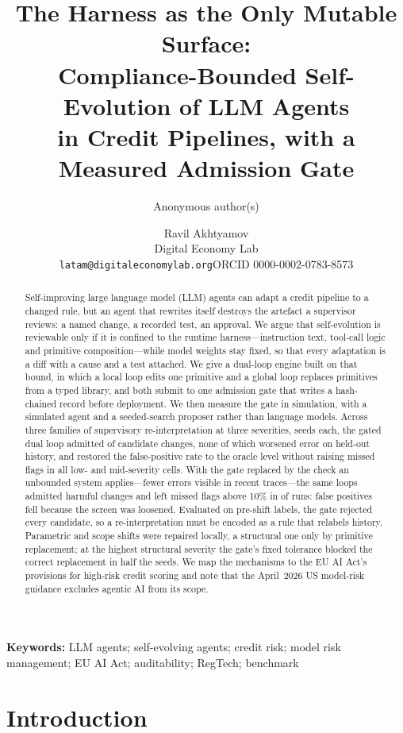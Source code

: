 \documentclass[11pt]{article}
\title{The Harness as the Only Mutable Surface:\\
Compliance-Bounded Self-Evolution of LLM Agents\\
in Credit Pipelines, with a Measured Admission Gate}
\author{Anonymous author(s)}
\author{Ravil Akhtyamov\\[2pt]
\small Digital Economy Lab\\
\small \texttt{latam@digitaleconomylab.org}\quad ORCID 0000-0002-0783-8573}
\date{}
\begin{document}
\maketitle

\begin{abstract}
\noindent
Self-improving large language model (LLM) agents can adapt a credit pipeline to a changed rule, but an agent that rewrites itself destroys the artefact a supervisor reviews: a named change, a recorded test, an approval. We argue that self-evolution is reviewable only if it is confined to the runtime harness---instruction text, tool-call logic and primitive composition---while model weights stay fixed, so that every adaptation is a diff with a cause and a test attached. We give a dual-loop engine built on that bound, in which a local loop edits one primitive and a global loop replaces primitives from a typed library, and both submit to one admission gate that writes a hash-chained record before deployment. We then measure the gate in simulation, with a simulated agent and a seeded-search proposer rather than language models. Across three families of supervisory re-interpretation at three severities, \nseeds{} seeds each, the gated dual loop admitted \gadmdual{} of \gpropdual{} candidate changes, none of which worsened error on held-out history, and restored the false-positive rate to the oracle level without raising missed flags in all low- and mid-severity cells. With the gate replaced by the check an unbounded system applies---fewer errors visible in recent traces---the same loops admitted \gfanogate{} harmful changes and left missed flags above 10\% in \gmtennogate{} of \ncells{} runs: false positives fell because the screen was loosened. Evaluated on pre-shift labels, the gate rejected every candidate, so a re-interpretation must be encoded as a rule that relabels history. Parametric and scope shifts were repaired locally, a structural one only by primitive replacement; at the highest structural severity the gate's fixed tolerance blocked the correct replacement in half the seeds. We map the mechanisms to the EU AI Act's provisions for high-risk credit scoring and note that the April~2026 US model-risk guidance excludes agentic AI from its scope.
\end{abstract}

\noindent\textbf{Keywords:} LLM agents; self-evolving agents; credit risk; model risk management; EU AI Act; auditability; RegTech; benchmark

\section{Introduction}
\end{document}
